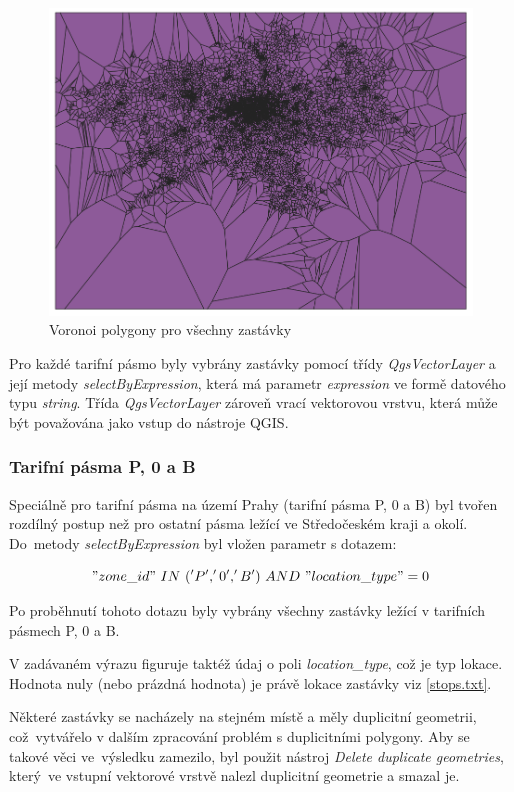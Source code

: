 \begin{figure}[H] \centering
    \includegraphics[width=400pt]{./pictures/voronoi-stops.png}
    \caption[Voronoi polygony pro všechny zastávky]{Voronoi polygony pro všechny zastávky}
	\label{fig:voronoi-stops}              
\end{figure}
  
Pro každé tarifní pásmo byly vybrány zastávky pomocí třídy \textit{QgsVectorLayer}
a její metody \textit{selectByExpression}, která má parametr \textit{expression} ve formě datového
typu \textit{string}. 
Třída \textit{QgsVectorLayer} zároveň vrací vektorovou vrstvu, která může být považována jako vstup do nástroje QGIS.

\subsubsection{Tarifní pásma P, 0 a B}

Speciálně pro tarifní pásma na území Prahy (tarifní pásma P, 0 a B) byl tvořen rozdílný postup
než pro ostatní pásma ležící ve Středočeském kraji a okolí. Do~meto\-dy \textit{selectByExpression} byl vložen
parametr s dotazem: 

\["zone\_id"\ IN\ ('P','0','B')\ AND\ "location\_type" = 0\]

Po proběhnutí tohoto dotazu byly vybrány všechny zastávky ležící v tarifních pásmech P, 0 a B. 

V zadávaném výrazu figuruje taktéž údaj o poli \textit{location\_type}, což je typ lokace. 
Hodnota nuly (nebo prázdná hodnota) je právě lokace zastávky viz \ref{stops.txt}.

Některé zastávky se nacházely na stejném místě a měly duplicitní geometrii, což~vytvářelo v dalším
zpracování problém s duplicitními polygony. Aby se takové věci ve~výsledku zamezilo, byl použit nástroj   
\textit{Delete duplicate geometries}, který~ve vstupní vektorové vrstvě nalezl duplicitní geometrie a smazal je.

